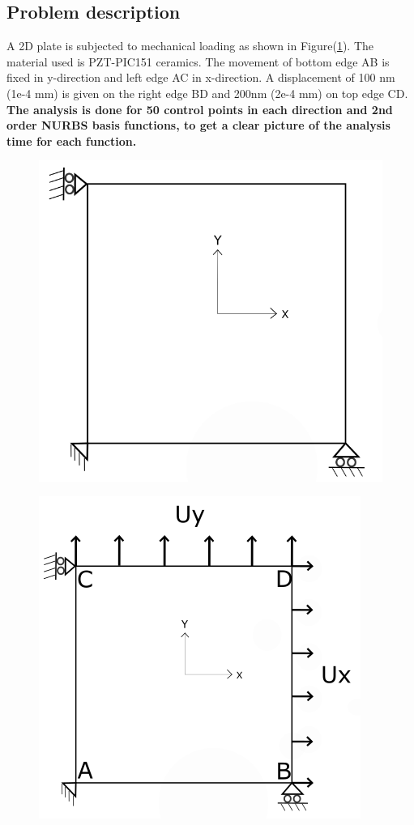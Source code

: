 \documentclass[11pt]{article}
\begin{document}
\subsection{Problem description} \label{2DPWLELPD}
A 2D plate is subjected to mechanical loading as shown in Figure(\ref{TimeitLoading}). The material used is PZT-PIC151 ceramics.
The movement of bottom edge AB is fixed in y-direction and left edge AC in x-direction. A displacement of 100 nm (1e-4 mm) is given on the right edge BD and 200nm (2e-4 mm) on top edge CD.
\textbf{The analysis is done for 50 control points in each direction and 2nd order NURBS basis functions, to get a clear picture of the analysis time for each function.}
\begin{figure}[H]
	\centering
	\begin{minipage}{.5\textwidth}
		\centering
		\includegraphics[width=0.8\linewidth]{2DPlate.png}
		\label{2Dplate}
	\end{minipage}%
	\begin{minipage}{.5\textwidth}
		\centering
		\includegraphics[width=0.9\linewidth]{TimeitLoading.png}
		\label{TimeitLoading}
	\end{minipage}
\end{figure}
\end{document}
